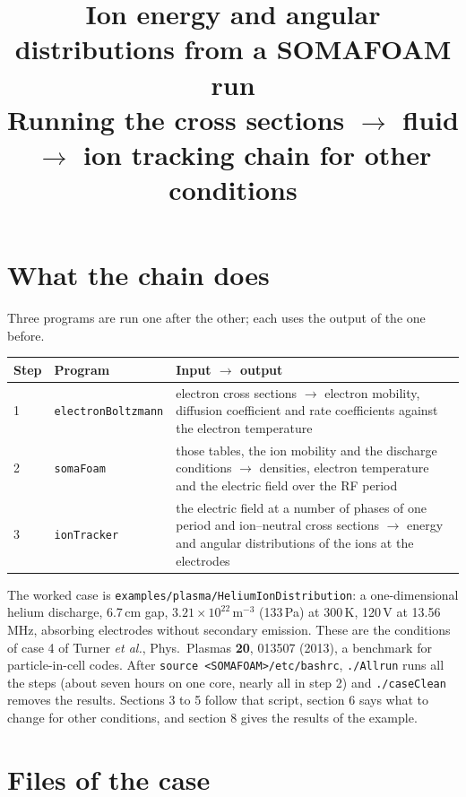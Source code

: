 \documentclass[10pt,a4paper]{article}
\title{Ion energy and angular distributions from a SOMAFOAM run\\[4pt]
\large Running the cross sections $\rightarrow$ fluid $\rightarrow$ ion
tracking chain for other conditions}
\date{}
\newcommand{\kw}[1]{\texttt{#1}}
\begin{document}
\sloppy
\maketitle
\vspace{-1.2cm}

\section{What the chain does}

Three programs are run one after the other; each uses the output of the one
before.

\begin{center}
\begin{tabular}{@{}ll>{\raggedright\arraybackslash}p{9.3cm}@{}}
\toprule
Step & Program & Input $\rightarrow$ output \\
\midrule
1 & \kw{electronBoltzmann} & electron cross sections $\rightarrow$ electron
  mobility, diffusion coefficient and rate coefficients against the electron
  temperature \\
2 & \kw{somaFoam} & those tables, the ion mobility and the discharge
  conditions $\rightarrow$ densities, electron temperature and the electric
  field over the RF period \\
3 & \kw{ionTracker} & the electric field at a number of phases of one period
  and ion--neutral cross sections $\rightarrow$ energy and angular
  distributions of the ions at the electrodes \\
\bottomrule
\end{tabular}
\end{center}

The worked case is \kw{examples/plasma/HeliumIonDistribution}: a
one-dimensional helium discharge, 6.7\,cm gap, $3.21\times10^{22}$\,m$^{-3}$
(133\,Pa) at 300\,K, 120\,V at 13.56\,MHz, absorbing electrodes without
secondary emission. These are the conditions of case 4 of Turner
\emph{et al.}, Phys.\ Plasmas \textbf{20}, 013507 (2013), a benchmark
for particle-in-cell codes. After \kw{source <SOMAFOAM>/etc/bashrc},
\kw{./Allrun} runs all the steps (about seven hours on one core, nearly all
in step 2) and \kw{./caseClean} removes the results. Sections 3 to 5 follow
that script, section 6 says what to change for other conditions, and
section 8 gives the results of the example.

\section{Files of the case}
\end{document}

